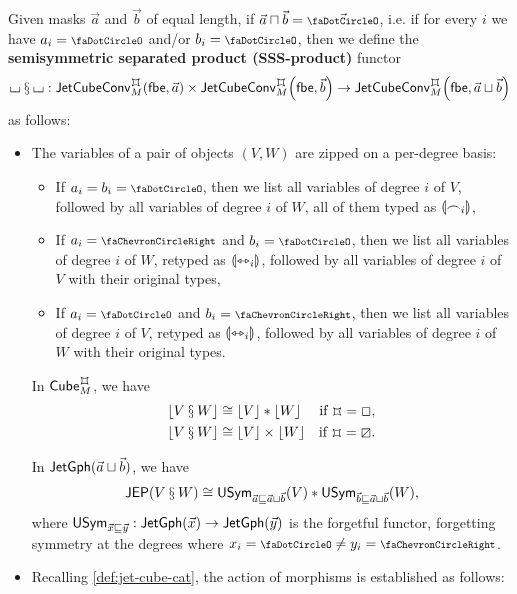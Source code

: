 \documentclass[a4paper]{memoir}
\begin{document}
\begin{definition} \label{def:sssprod}
	Given masks $\vec a$ and $\vec b$ of equal length, if $\vec a \sqcap \vec b = \vec \npolar$, i.e. if for every $i$ we have $a_i = \npolar$ and/or $b_i = \npolar$, then we define the \textbf{semisymmetric separated product (SSS-product)} functor
	\[
		\loch \sss \loch : \convjetcubetri \mycubex M {\vec a} \times \convjetcubetri \mycubex M {\vec b} \to \convjetcubetri \mycubex M {\vec a \sqcup \vec b}
	\]
	as follows:
	\begin{itemize}
		\item %
		The variables of a pair of objects $(V, W)$ are zipped on a per-degree basis:
		\begin{itemize}
			\item If $a_i = b_i = \npolar$, then we list all variables of degree $i$ of $V$, followed by all variables of degree $i$ of $W$, all of them typed as ${\llparenthesis \frown_i \rrparenthesis}$,
			\item If $a_i = \ypolar$ and $b_i = \npolar$, then we list all variables of degree $i$ of $W$, retyped as ${\llparenthesis \leftrightarrowtriangle_i \rrparenthesis}$, followed by all variables of degree $i$ of $V$ with their original types,
			\item If $a_i = \npolar$ and $b_i = \ypolar$, then we list all variables of degree $i$ of $V$, retyped as ${\llparenthesis \leftrightarrowtriangle_i \rrparenthesis}$, followed by all variables of degree $i$ of $W$ with their original types.
		\end{itemize}
		\begin{corollary} \label{thm:erase-sssprod}
			In $\cubecat_M^\mycubex$, we have
			\begin{align*}
				\erasejc{V \sss W} &\cong \erasejc V * \erasejc W &\text{if $\mycubex = \affine$,} \\
				\erasejc{V \sss W} &\cong \erasejc V \times \erasejc W &\text{if $\mycubex = \cartes$.}
			\end{align*}
		\end{corollary}
		\begin{corollary}
			In $\mathsf{JetGph}(\vec a \sqcup \vec b)$, we have
			\[
				\mathsf{JEP}(V \mathbin{\mathsection} W) \cong \mathsf{USym}_{\vec a \sqsubseteq \vec a \sqcup \vec b}(V) * \mathsf{USym}_{\vec b \sqsubseteq \vec a \sqcup \vec b}(W),
			\]
			where $\mathsf{USym}_{\vec x \sqsubseteq \vec y} : \mathsf{JetGph}(\vec x) \to \mathsf{JetGph}(\vec y)$ is the forgetful functor, forgetting symmetry at the degrees where $x_i = \npolar \neq y_i = \ypolar$.
		\end{corollary}
		\item Recalling \cref{def:jet-cube-cat}, the action of morphisms is established as follows:

\end{itemize}
\end{definition}
\end{document}
